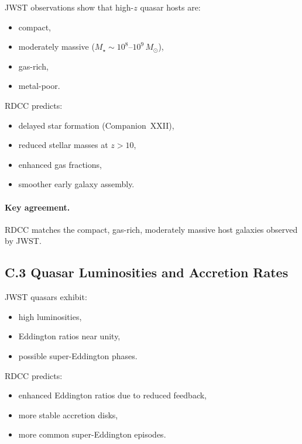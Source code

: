 \documentclass[11pt,a4paper]{article}
\begin{document}
JWST observations show that high-$z$ quasar hosts are:

\begin{itemize}
    \item compact,
    \item moderately massive ($M_{\star} \sim 10^{8}$–$10^{9}\,M_{\odot}$),
    \item gas-rich,
    \item metal-poor.
\end{itemize}

RDCC predicts:

\begin{itemize}
    \item delayed star formation (Companion~XXII),
    \item reduced stellar masses at $z > 10$,
    \item enhanced gas fractions,
    \item smoother early galaxy assembly.
\end{itemize}

\paragraph{Key agreement.}
RDCC matches the compact, gas-rich, moderately massive host galaxies observed by JWST.

\subsection*{C.3 Quasar Luminosities and Accretion Rates}

JWST quasars exhibit:

\begin{itemize}
    \item high luminosities,
    \item Eddington ratios near unity,
    \item possible super-Eddington phases.
\end{itemize}

RDCC predicts:

\begin{itemize}
    \item enhanced Eddington ratios due to reduced feedback,
    \item more stable accretion disks,
    \item more common super-Eddington episodes.
\end{itemize}
\end{document}
